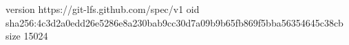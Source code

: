 version https://git-lfs.github.com/spec/v1
oid sha256:4c3d2a0edd26e5286e8a230bab9cc30d7a09b9b65fb869f5bba56354645c38cb
size 15024
